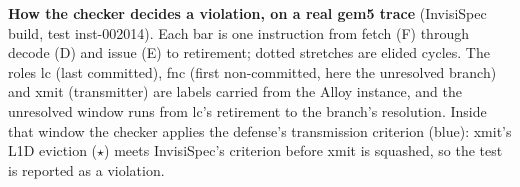 \textbf{How the checker decides a violation, on a real gem5 trace} (InvisiSpec build, test inst-002014). Each bar is one instruction from fetch (F) through decode (D) and issue (E) to retirement; dotted stretches are elided cycles. The roles lc (last committed), fnc (first non-committed, here the unresolved branch) and xmit (transmitter) are labels carried from the Alloy instance, and the unresolved window runs from lc's retirement to the branch's resolution. Inside that window the checker applies the defense's transmission criterion (blue): xmit's L1D eviction ($\star$) meets InvisiSpec's criterion before xmit is squashed, so the test is reported as a violation.
